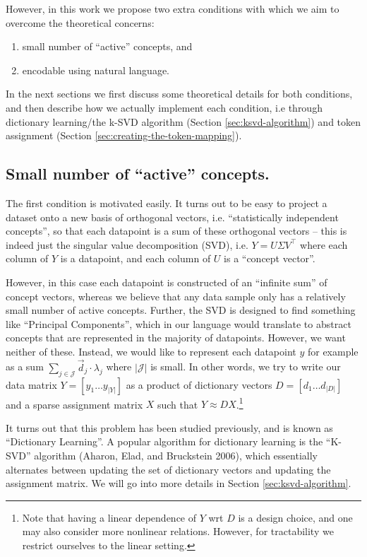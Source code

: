 \documentclass[11pt]{article}
\makeatletter
\newcommand{\cslcitation}[2]
 {\protect\hyper@linkstart{cite}{citeproc_bib_item_#1}#2\hyper@linkend}
\makeatother
\begin{document}
However, in this work we propose two extra conditions with which we aim to overcome the theoretical concerns:
\begin{enumerate}
\item small number of ``active'' concepts, and
\item encodable using natural language.
\end{enumerate}

In the next sections we first discuss some theoretical details for both conditions, and then describe how we actually implement each condition, i.e through dictionary learning/the k-SVD algorithm (Section \ref{sec:ksvd-algorithm}) and token assignment (Section \ref{sec:creating-the-token-mapping}).
\subsection{Small number of ``active'' concepts.}
\label{sec:org51a3f8c}
The first condition is motivated easily.
It turns out to be easy to project a dataset onto a new basis of orthogonal vectors, i.e. ``statistically independent concepts'', so that each datapoint is a sum of these orthogonal vectors -- this is indeed just the singular value decomposition (SVD), i.e. \(Y = U \Sigma V^\top\) where each column of \(Y\) is a datapoint, and each column of \(U\) is a ``concept vector''.

However, in this case each datapoint is constructed of an ``infinite sum'' of concept vectors, whereas we believe that any data sample only has a relatively small number of active concepts.
Further, the SVD is designed to find something like ``Principal Components'', which in our language would translate to abstract concepts that are represented in the majority of datapoints.
However, we want neither of these.
Instead, we would like to represent each datapoint \(y\) for example as a sum \(\sum_{j \in \mathcal{J}} \vec{d}_j \cdot \lambda_j\) where \(|\mathcal{J}|\) is small.
In other words, we try to write our data matrix \(Y = [y_1 \dots y_{|Y|}]\) as a product of dictionary vectors \(D = [d_1 \dots d_{|D|}]\) and a sparse assignment matrix \(X\) such that \(Y \approx D X\).\footnote{Note that having a linear dependence of \(Y\) wrt \(D\) is a design choice, and one may also consider more nonlinear relations. However, for tractability we restrict ourselves to the linear setting.}

It turns out that this problem has been studied previously, and is known as ``Dictionary Learning''.
A popular algorithm for dictionary learning is the ``K-SVD'' algorithm (\cslcitation{1}{Aharon, Elad, and Bruckstein 2006}), which essentially alternates between updating the set of dictionary vectors and updating the assignment matrix.
We will go into more details in Section \ref{sec:ksvd-algorithm}.
\end{document}
